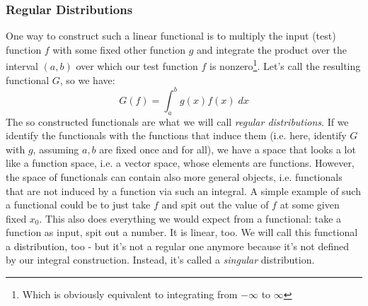 \subsubsection{Regular Distributions}
One way to construct such a linear functional is to multiply the input (test) function $f$ with some fixed other function $g$ and integrate the product over the interval $(a,b)$ over which our test function $f$ is nonzero\footnote{Which is obviously equivalent to integrating from $-\infty$ to $\infty$}. Let's call the resulting functional $G$, so we have:
\begin{equation}
 G(f) = \int_a^b g(x) f(x) \; dx
\end{equation}
The so constructed functionals are what we will call \emph{regular distributions}. If we identify the functionals with the functions that induce them (i.e. here, identify $G$ with $g$, assuming $a,b$ are fixed once and for all), we have a space that looks a lot like a function space, i.e. a vector space, whose elements are functions. However, the space of functionals can contain also more general objects, i.e. functionals that are not induced by a function via such an integral. A simple example of such a functional could be to just take $f$ and spit out the value of $f$ at some given fixed $x_0$. This also does everything we would expect from a functional: take a function as input, spit out a number. It is linear, too. We will call this functional a distribution, too - but it's not a regular one anymore because it's not defined by our integral construction. Instead, it's called a \emph{singular} distribution.






